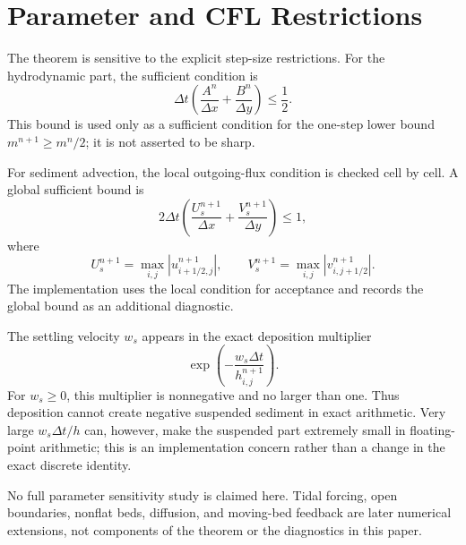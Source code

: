 \section{Parameter and CFL Restrictions}

The theorem is sensitive to the explicit step-size restrictions. For the hydrodynamic part, the sufficient condition is
\[
\Delta t\left(\frac{A^n}{\Delta x}+\frac{B^n}{\Delta y}\right)\le\frac12.
\]
This bound is used only as a sufficient condition for the one-step lower bound \(m^{n+1}\ge m^n/2\); it is not asserted to be sharp.

For sediment advection, the local outgoing-flux condition is checked cell by cell. A global sufficient bound is
\[
2\Delta t\left(\frac{U_s^{n+1}}{\Delta x}+\frac{V_s^{n+1}}{\Delta y}\right)\le1,
\]
where
\[
U_s^{n+1}=\max_{i,j}|u_{i+1/2,j}^{n+1}|,
\qquad
V_s^{n+1}=\max_{i,j}|v_{i,j+1/2}^{n+1}|.
\]
The implementation uses the local condition for acceptance and records the global bound as an additional diagnostic.

The settling velocity \(w_s\) appears in the exact deposition multiplier
\[
\exp\left(-\frac{w_s\Delta t}{h_{i,j}^{n+1}}\right).
\]
For \(w_s\ge0\), this multiplier is nonnegative and no larger than one. Thus deposition cannot create negative suspended sediment in exact arithmetic. Very large \(w_s\Delta t/h\) can, however, make the suspended part extremely small in floating-point arithmetic; this is an implementation concern rather than a change in the exact discrete identity.

No full parameter sensitivity study is claimed here. Tidal forcing, open boundaries, nonflat beds, diffusion, and moving-bed feedback are later numerical extensions, not components of the theorem or the diagnostics in this paper.
